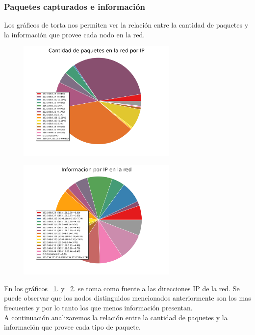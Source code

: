\FloatBarrier

\subsubsection{Paquetes capturados e información}

Los gráficos de torta nos permiten ver la relación entre la cantidad de paquetes y la información que provee cada nodo en la red. 

\begin{figure}[h!]
  \centering
   \includegraphics[width=0.7\textwidth]{graficos/red_domestica_pie_arp.png}
  \caption{}
  \label{fig:red_domestica_pie_arp}
\end{figure}

\begin{figure}[h!]
  \centering
   \includegraphics[width=0.7\textwidth]{graficos/red_domestica_pie_arp_information.png}
  \caption{}
  \label{fig:red_domestica_pie_arp_information}
\end{figure}

En los gráficos ~\ref{fig:red_domestica_pie_arp}. y ~\ref{fig:red_domestica_pie_arp_information}. se toma como fuente a las direcciones IP de la red.
Se puede observar que los nodos distinguidos mencionados anteriormente son los mas frecuentes y por lo tanto los que menos información presentan.
\\
A continuación analizaremos la relación entre la cantidad de paquetes y la información que provee cada tipo de paquete.

